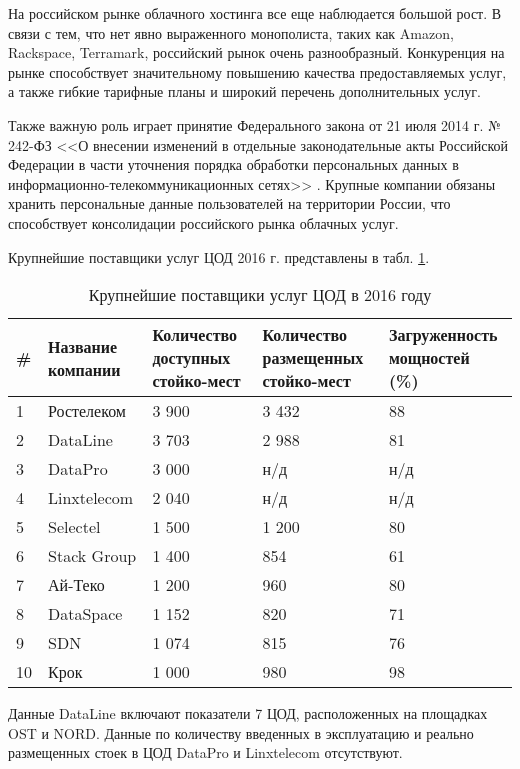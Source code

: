 На российском рынке облачного хостинга все еще наблюдается большой рост.
В связи с тем, что нет явно выраженного монополиста, таких как Amazon, Rackspace, Terramark, российский рынок очень разнообразный.
Конкуренция на рынке способствует значительному повышению качества предоставляемых услуг, а также гибкие тарифные планы и широкий перечень дополнительных услуг.

Также важную роль играет принятие Федерального закона от 21 июля 2014 г. № 242-ФЗ <<О внесении изменений в отдельные законодательные акты Российской Федерации в части уточнения порядка обработки персональных данных в информационно-телекоммуникационных сетях>> \cite{minsvyaz}.
Крупные компании обязаны хранить персональные данные пользователей на территории России, что способствует консолидации российского рынка облачных услуг.

Крупнейшие поставщики услуг ЦОД 2016 г. \cite{cnews} представлены в табл. \ref{dc-table}.
\begin{table}[H]
  \caption{Крупнейшие поставщики услуг ЦОД в 2016 году}\label{dc-table}
  \begin{tabular}{|p{0.6cm}|p{2.6cm}|p{3cm}|p{3.5cm}|p{3.5cm}|}
  \hline \# & Название компании & Количество доступных стойко-мест & Количество размещенных стойко-мест & Загруженность мощностей (\%) \\
  \hline 1 & Ростелеком & 3 900 & 3 432 & 88 \\
  \hline 2 & DataLine & 3 703 & 2 988 & 81 \\
  \hline 3 & DataPro & 3 000 & н/д & н/д \\
  \hline 4 & Linxtelecom & 2 040 & н/д & н/д \\
  \hline 5 & Selectel & 1 500 & 1 200 & 80 \\
  \hline 6 & Stack Group & 1 400 & 854 & 61 \\
  \hline 7 & Ай-Теко & 1 200 & 960 & 80 \\
  \hline 8 & DataSpace & 1 152 & 820 & 71 \\
  \hline 9 & SDN & 1 074 & 815 & 76 \\
  \hline 10 & Крок & 1 000 & 980 & 98 \\
  \hline
  \end{tabular}
\end{table}

Данные DataLine включают показатели 7 ЦОД, расположенных на площадках OST и NORD.
Данные по количеству введенных в эксплуатацию и реально размещенных стоек в ЦОД DataPro и Linxtelecom отсутствуют.


